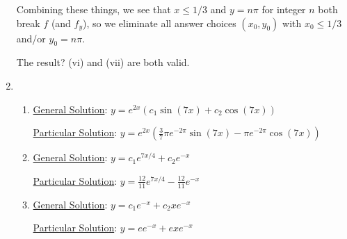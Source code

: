 \documentclass[12pt]{article}
\theoremstyle{definition}
\theoremstyle{underl}
\begin{document}
\begin{enumerate}[topsep=0.125in,itemsep=9mm]
		Combining these things, we see that $x\leq 1/3$ and $y=n\pi$ for integer $n$ both break $f$ (and $f_y$), so we eliminate all answer choices $(x_0,y_0)$ with $x_0\leq 1/3$ and/or $y_0=n\pi$.
		
		The result? (vi) and (vii) are both valid.
		
		\newpage
		
	
		\item \begin{enumerate}[itemsep=4.5mm]
			\item \ul{General Solution}: $y=e^{2x}\left(c_1\sin(7x)+c_2\cos(7x)\right)$
			
			\vspace{3mm}
			\ul{Particular Solution}: $y=e^{2x}\left(\frac{3}{7}\pi e^{-2\pi}\sin(7x)-\pi e^{-2\pi}\cos(7x)\right)$
			
			\item \ul{General Solution}: $y=c_1e^{7x/4}+c_2e^{-x}$
			
			\vspace{3mm}
			\ul{Particular Solution}: $y=\frac{12}{11}e^{7x/4}-\frac{12}{11}e^{-x}$
			
			\item \ul{General Solution}: $y=c_1e^{-x}+c_2xe^{-x}$
			
			\vspace{3mm}
			\ul{Particular Solution}: $y=e e^{-x}+e x e^{-x}$
		\end{enumerate}
		
	

\end{enumerate}
\end{document}
